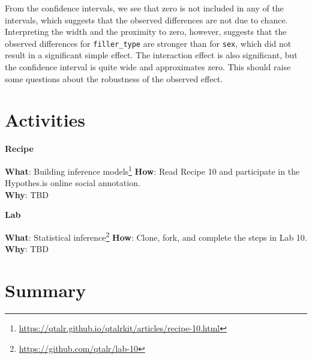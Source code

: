 \documentclass[
  letterpaper,
  DIV=11,
  numbers=noendperiod]{scrreprt}
\theoremstyle{definition}
\theoremstyle{remark}
\DeclareRobustCommand{\href}[2]{#2\footnote{\url{#1}}}
\begin{document}
From the confidence intervals, we see that zero is not included in any
of the intervals, which suggests that the observed differences are not
due to chance. Interpreting the width and the proximity to zero,
however, suggests that the observed differences for
\texttt{filler\_type} are stronger than for \texttt{sex}, which did not
result in a significant simple effect. The interaction effect is also
significant, but the confidence interval is quite wide and approximates
zero. This should raise some questions about the robustness of the
observed effect.

\section*{Activities}\label{activities-8}


\begin{tcolorbox}[enhanced jigsaw, leftrule=.75mm, colframe=quarto-callout-color-frame, colback=white, rightrule=.15mm, opacityback=0, arc=.35mm, breakable, bottomrule=.15mm, left=2mm, toprule=.15mm]

\textbf{ Recipe}

\textbf{What}:
\href{https://qtalr.github.io/qtalrkit/articles/recipe-10.html}{Building
inference models} \textbf{How}: Read Recipe 10 and participate in the
Hypothes.is online social annotation.\\
\textbf{Why}:  TBD

\end{tcolorbox}

\begin{tcolorbox}[enhanced jigsaw, leftrule=.75mm, colframe=quarto-callout-color-frame, colback=white, rightrule=.15mm, opacityback=0, arc=.35mm, breakable, bottomrule=.15mm, left=2mm, toprule=.15mm]

\textbf{ Lab}

\textbf{What}: \href{https://github.com/qtalr/lab-10}{Statistical
inference} \textbf{How}: Clone, fork, and complete the steps in Lab
10.\\
\textbf{Why}:  TBD

\end{tcolorbox}

\section*{Summary}\label{summary-9}
\end{document}
